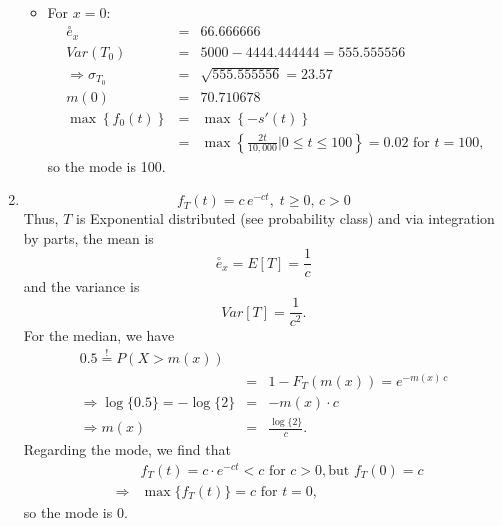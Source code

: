 \documentclass[11pt,fleqn,oneside]{book}
\begin{document}
\begin{enumerate}
\begin{itemize}
\begin{eqnarray*}
\end{eqnarray*}
\item For $x=0$:
\begin{eqnarray*}
\stackrel{\circ}{e}_x &=& 66.666666 \\
Var(T_0) &=& 5000 - 4444.444444 = 555.555556\\
\Rightarrow \sigma_{T_0} &=& \sqrt{555.555556} = 23.57\\
m(0) &=& 70.710678 \\
\max\left\{f_{0}(t)\right\} &=& \max\left\{-s'(t)\right\}\\
&=& \max\left\{\frac{2t}{10,000} | 0 \leq t \leq 100\right\} = 0.02 \text{ for } t=100, 
\end{eqnarray*}
so the mode is 100.
\end{itemize}

\item
$$
f_T(t) = c\,e^{-ct},\;t\geq 0, \, c>0
$$
Thus,  $T$ is Exponential distributed (see probability class)  and via integration by parts, the mean is
$$
\stackrel{\circ}{e}_x = E[T] = \frac{1}{c}
$$ 
and the variance is
$$
Var[T] = \frac{1}{c^2}.
$$
For the median, we have
\begin{eqnarray*}
0.5 \stackrel{!}{=} P(X>m(x)) \\
&=& 1 - F_T(m(x)) = e^{-m(x)\,c} \\
\Rightarrow \log\{0.5\} = -\log\{2\} &=& -m(x)\cdot c \\
\Rightarrow m(x) &=& \frac{\log\{2\}}{c}.
\end{eqnarray*}
Regarding the mode, we find that
\begin{eqnarray*}
&& f_T(t) = c\cdot e^{-ct} < c \text{ for } c>0,\text{but } f_T(0)=c \\
&\Rightarrow& \max\{f_T(t)\} = c \text{ for } t = 0,
\end{eqnarray*}
so the mode is $0$.


\end{enumerate}
\end{document}
